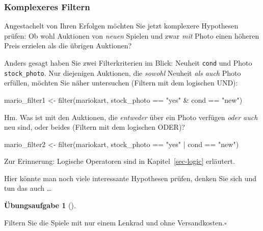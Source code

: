 \documentclass[
  a4paper,
  DIV=11]{scrreprt}
\newenvironment{Shaded}{\begin{snugshade}}{\end{snugshade}}
\newcommand{\FunctionTok}[1]{\textcolor[rgb]{0.28,0.35,0.67}{#1}}
\newcommand{\NormalTok}[1]{\textcolor[rgb]{0.00,0.23,0.31}{#1}}
\newcommand{\OtherTok}[1]{\textcolor[rgb]{0.00,0.23,0.31}{#1}}
\newcommand{\SpecialCharTok}[1]{\textcolor[rgb]{0.37,0.37,0.37}{#1}}
\newcommand{\StringTok}[1]{\textcolor[rgb]{0.13,0.47,0.30}{#1}}
\theoremstyle{definition}
\newtheorem{exercise}{Übungsaufgabe}[chapter]
\theoremstyle{definition}
\theoremstyle{definition}
\theoremstyle{remark}
\begin{document}
\subsubsection{Komplexeres Filtern}\label{komplexeres-filtern}

Angestachelt von Ihren Erfolgen möchten Sie jetzt komplexere Hypothesen
prüfen: Ob wohl Auktionen von \emph{neuen} Spielen und zwar \emph{mit}
Photo einen höheren Preis erzielen als die übrigen Auktionen?

Anders gesagt haben Sie zwei Filterkriterien im Blick: Neuheit
\texttt{cond} und Photo \texttt{stock\_photo}. Nur diejenigen Auktionen,
die \emph{sowohl} Neuheit \emph{als auch} Photo erfüllen, möchten Sie
näher untersuchen (Filtern mit dem logischen UND):

\begin{Shaded}
\begin{Highlighting}[]
\NormalTok{mario\_filter1 }\OtherTok{\textless{}{-}} \FunctionTok{filter}\NormalTok{(mariokart, stock\_photo }\SpecialCharTok{==} \StringTok{"yes"} \SpecialCharTok{\&}\NormalTok{ cond }\SpecialCharTok{==} \StringTok{"new"}\NormalTok{)}
\end{Highlighting}
\end{Shaded}

Hm. Was ist mit den Auktionen, die \emph{entweder} über ein Photo
verfügen \emph{oder auch} neu sind, oder beides (Filtern mit dem
logischen ODER)?

\begin{Shaded}
\begin{Highlighting}[]
\NormalTok{mario\_filter2 }\OtherTok{\textless{}{-}} \FunctionTok{filter}\NormalTok{(mariokart, }
\NormalTok{                        stock\_photo }\SpecialCharTok{==} \StringTok{"yes"} \SpecialCharTok{|}\NormalTok{ cond }\SpecialCharTok{==} \StringTok{"new"}\NormalTok{)}
\end{Highlighting}
\end{Shaded}

Zur Erinnerung: Logische Operatoren sind in Kapitel~\ref{sec-logic}
erläutert.

Hier könnte man noch viele interessante Hypothesen prüfen, denken Sie
sich und tun das auch \ldots{}

\begin{exercise}[]\protect\hypertarget{exr-filter2}{}\label{exr-filter2}

Filtern Sie die Spiele mit nur einem Lenkrad und ohne
Versandkosten.\(\square\)

\end{exercise}
\end{document}
